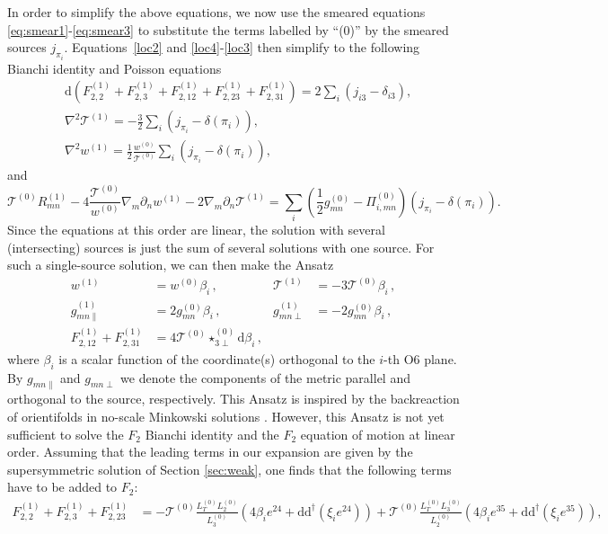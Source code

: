 \documentclass[11pt]{article}
\newcommand{\be}{\begin{equation}}
\newcommand{\ee}{\end{equation}}
\def\be{\begin{equation}}
\def\ee{\end{equation}}
\renewcommand{\[}{\left[}
\renewcommand{\]}{\right]}
\renewcommand{\(}{\left(}
\renewcommand{\)}{\right)}
\renewcommand{\d}{\textrm{d}}
\newcommand{\<}{\langle}
\renewcommand{\>}{\rangle}
\begin{document}
In order to simplify the above equations, we now use the smeared equations \eqref{eq:smear1}-\eqref{eq:smear3} to substitute the terms labelled by ``(0)'' by the smeared sources $j_{\pi_i}$. Equations~\eqref{loc2} and \eqref{loc4}-\eqref{loc3} then simplify to the following Bianchi identity and Poisson equations
\begin{align}
& \d \left( F_{2,2}^{(1)} + F_{2,3}^{(1)} + F_{2,12}^{(1)} + F_{2,23}^{(1)} + F_{2,31}^{(1)} \right) =  2\sum_i (j_{i3}-\delta_{i3}), \label{final-eom1} \\
& \nabla^2 \mathcal{T}^{(1)} = -\frac{3}{2}\sum_i \left( j_{\pi_i}- \delta(\pi_i) \right), \label{final-eom2} \\
& \nabla^2 w^{(1)} = \frac{1}{2} \frac{w^{(0)}}{\mathcal{T}^{(0)}}  \sum_i \left( j_{\pi_i}- \delta(\pi_i) \right), \label{final-eom3}
\end{align}
and 
\be
\mathcal{T}^{(0)} R^{(1)}_{mn} - 4 \frac{\mathcal{T}^{(0)}}{w^{(0)}}\nabla_m \partial_n w^{(1)} - 2 \nabla_m \partial_n \mathcal{T}^{(1)} = \sum_i \left( \frac{1}{2}g^{(0)}_{mn}-\Pi^{(0)}_{i,mn}\right)  \left( j_{\pi_i}- \delta(\pi_i) \right). \label{final-eom4}
\ee
Since the equations at this order are linear, the solution with several (intersecting) sources is just the sum of several solutions with one source. For such a single-source solution, we can then make the Ansatz
\begin{align}
\label{eq:linear_solutions}
 w^{(1)}&= w^{(0)} \beta_i\,, & \mathcal{T}^{(1)}&= -3\mathcal{T}^{(0)} \beta_i\,,\\  
\label{eq:linear_solutions2}
g_{mn\parallel}^{(1)}&=2g_{mn}^{(0)}\beta_i\,, & g_{mn\perp}^{(1)}&=-2g_{mn}^{(0)}\beta_i\,, \\
F_{2,12}^{(1)}+F_{2,31}^{(1)}&=4\mathcal{T}^{(0)}\star_{3\perp}^{(0)}\d \beta_i\,, &&
\end{align}
where $\beta_i$ is a scalar function of the coordinate(s) orthogonal to the $i$-th O6 plane. By $g_{mn\parallel}$ and $g_{mn\perp}$ we denote the components of the metric parallel and orthogonal to the source, respectively. This Ansatz is inspired by the backreaction of orientifolds in no-scale Minkowski solutions \cite{Blaback:2010sj}. However, this Ansatz is not yet sufficient to solve the $F_2$ Bianchi identity and the $F_2$ equation of motion at linear order.
Assuming that the leading terms in our expansion are given by the supersymmetric solution of Section \ref{sec:weak}, one finds that the following terms have to be added to $F_2$:
\begin{align}
F_{2,2}^{(1)} + F_{2,3}^{(1)} + F_{2,23}^{(1)} &=   -\mathcal{T}^{(0)} \frac{L_T^{(0)}L_2^{(0)}}{L_3^{(0)}} \left( 4\beta_i
e^{24} + \d \d^\dagger (\xi_i e^{24}) \right) + \mathcal{T}^{(0)}
\frac{L_T^{(0)}L_3^{(0)}}{L_2^{(0)}} \left(4\beta_i e^{35} +  \d \d^\dagger (\xi_i e^{35})\right),
\label{eq:linear_solutions3}
\end{align}
\end{document}
